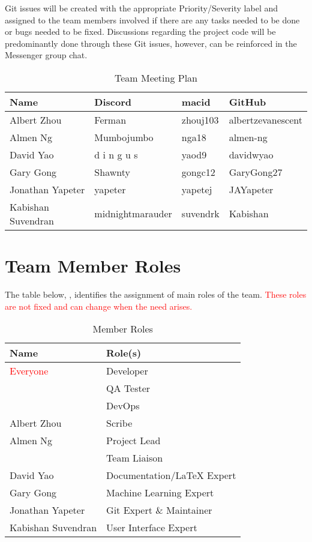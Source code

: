 \documentclass[12pt,letterpaper]{article}
\begin{document}
Git issues will be created with the appropriate Priority/Severity label and
assigned to the team members involved if there are any tasks needed to be done
or bugs needed to be fixed. Discussions regarding the project code will be
predominantly done through these Git issues, however, can be reinforced in the
Messenger group chat.

\begin{table}[hp]
\begin{tabularx}{\textwidth}{|l|X|X|X|}
\toprule
\textbf{Name} & \textbf{Discord} & \textbf{macid} & \textbf{GitHub}\\
\midrule
Albert Zhou & Ferman & zhouj103 & albertzevanescent\\
Almen Ng & Mumbojumbo & nga18 & almen-ng\\
David Yao & d i n g u s & yaod9 & davidwyao\\
Gary Gong & Shawnty & gongc12 & GaryGong27\\
Jonathan Yapeter & yapeter & yapetej & JAYapeter\\
Kabishan Suvendran & midnightmarauder & suvendrk & Kabishan\\
\bottomrule
\end{tabularx}
\caption{Team Meeting Plan} \label{tab:teamMeetingPlan}
\end{table}

\section{Team Member Roles}
The table below, , identifies the assignment of main
roles of the team. \textcolor{red}{These roles are not fixed and can change when
the need arises.}
\begin{table}[hp!] 
    \centering
    \begin{tabularx}{\textwidth}{|X|X|}
        \toprule
        \textbf{Name} & \textbf{Role(s)}\\
        \midrule
        \textcolor{red}{Everyone}   & Developer\\
                                    & QA Tester\\
                                    & DevOps \\
        \hline
        Albert Zhou                 & Scribe\\
        \hline
        Almen Ng                    & Project Lead\\
        & Team Liaison\\
        \hline
        David Yao                   & Documentation/LaTeX Expert\\
        \hline
        Gary Gong                   & Machine Learning Expert \\
        \hline
        Jonathan Yapeter            & Git Expert \& Maintainer\\
        \hline
        Kabishan Suvendran          & User Interface Expert\\
        \bottomrule
    \end{tabularx}
\caption{Member Roles} \label{tab:memberRoles}
\end{table}
\end{document}
